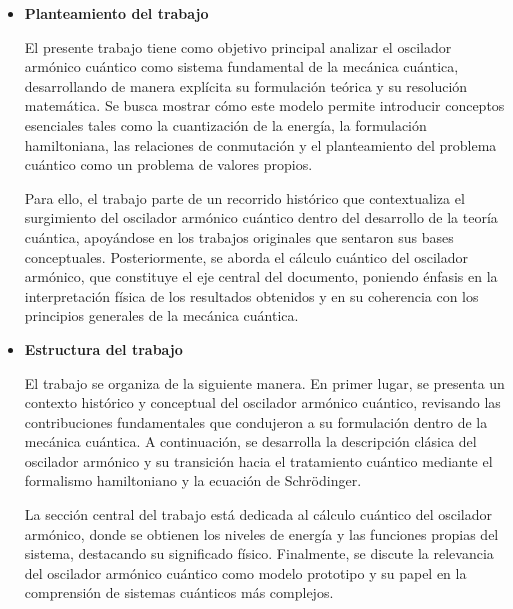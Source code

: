 \documentclass[11pt,a4paper,spanish]{book}
\begin{document}
\begin{itemize}
	Estas contribuciones consolidaron al oscilador armónico cuántico no solo como un modelo pedagógico, sino como un sistema estructural de la mecánica cuántica, presente en la descripción de una amplia variedad de fenómenos físicos. Su estudio detallado resulta, por tanto, esencial para comprender los fundamentos teóricos de la física cuántica y los principios matemáticos que subyacen a sistemas cuánticos más complejos.
	
	\item \textbf{Planteamiento del trabajo}
	
	El presente trabajo tiene como objetivo principal analizar el oscilador armónico cuántico como sistema fundamental de la mecánica cuántica, desarrollando de manera explícita su formulación teórica y su resolución matemática. Se busca mostrar cómo este modelo permite introducir conceptos esenciales tales como la cuantización de la energía, la formulación hamiltoniana, las relaciones de conmutación y el planteamiento del problema cuántico como un problema de valores propios.
	
	Para ello, el trabajo parte de un recorrido histórico que contextualiza el surgimiento del oscilador armónico cuántico dentro del desarrollo de la teoría cuántica, apoyándose en los trabajos originales que sentaron sus bases conceptuales. Posteriormente, se aborda el cálculo cuántico del oscilador armónico, que constituye el eje central del documento, poniendo énfasis en la interpretación física de los resultados obtenidos y en su coherencia con los principios generales de la mecánica cuántica.
	
	\item \textbf{Estructura del trabajo}
	
	El trabajo se organiza de la siguiente manera. En primer lugar, se presenta un contexto histórico y conceptual del oscilador armónico cuántico, revisando las contribuciones fundamentales que condujeron a su formulación dentro de la mecánica cuántica. A continuación, se desarrolla la descripción clásica del oscilador armónico y su transición hacia el tratamiento cuántico mediante el formalismo hamiltoniano y la ecuación de Schrödinger.
	
	La sección central del trabajo está dedicada al cálculo cuántico del oscilador armónico, donde se obtienen los niveles de energía y las funciones propias del sistema, destacando su significado físico. Finalmente, se discute la relevancia del oscilador armónico cuántico como modelo prototipo y su papel en la comprensión de sistemas cuánticos más complejos.
	
\end{itemize}
\end{document}
